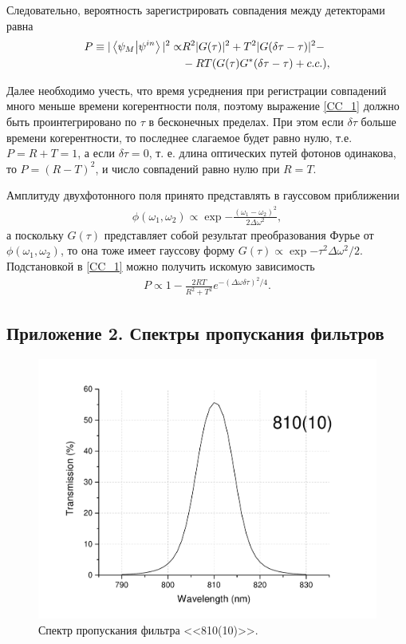 \documentclass[12pt,a5paper]{article}
\numberwithin{equation}{section}
\begin{document}
Следовательно, вероятность зарегистрировать совпадения между детекторами равна \begin{equation}
\begin{split}
    P\equiv|\bra{\psi_M}\ket{\psi^{in}}|^2 \propto &
     R^2 |G(\tau)|^2+T^2 |G(\delta\tau-\tau)|^2 -\\
     &-RT (G(\tau)G^*(\delta\tau-\tau)+ c.c.),
\label{CC_1}
\end{split}
\end{equation}

Далее необходимо учесть, что время усреднения при регистрации совпадений много меньше времени когерентности поля, поэтому выражение \ref{CC_1} должно быть проинтегрировано по $\tau$ в бесконечных пределах. При этом если $\delta\tau$ больше времени когерентности, то последнее слагаемое будет равно нулю, т.е. $P=R+T=1$, а если $\delta\tau=0$, т. е. длина оптических путей фотонов одинакова, то $P=(R-T)^2$, и число совпадений равно нулю при $R=T$.

Амплитуду двухфотонного поля  принято представлять в гауссовом приближении \begin{gather}
   \phi(\omega_1, \omega_2) \propto \exp{-\frac{(\omega_1-\omega_2)^2}{2\Delta\omega^2}}, \label{phi}
 \end{gather}
а поскольку $G(\tau)$ представляет собой результат преобразования Фурье от $\phi(\omega_1, \omega_2)$, то она тоже имеет гауссову форму
$G(\tau)\propto \exp{-\tau^2 \Delta\omega^2/2}$.
Подстановкой в \ref{CC_1} можно получить искомую зависимость
\begin{gather}
    P\propto 1-\frac{2RT}{R^2+T^2} e^{-(\Delta\omega \delta\tau)^2/4}. \label{P}
 \end{gather}


\subsection{Приложение 2. Спектры пропускания фильтров} \label{filters_spectra}
\begin{figure}[]
  \begin{center}
  \includegraphics[width=\linewidth]{filters_spectra/810_10.pdf}
  \caption{Спектр пропускания фильтра <<810(10)>>. }\label{fig:810(10)}
  \end{center}
  \end{figure}
\end{document}
